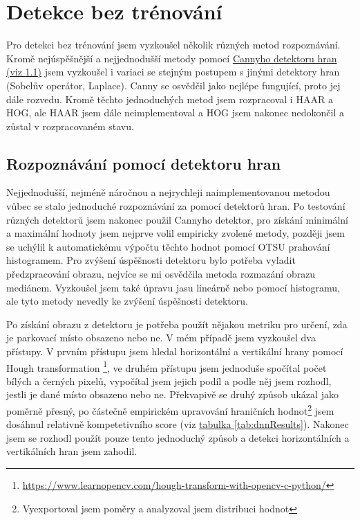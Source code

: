 \documentclass[10pt,a4paper, table]{article}
\begin{document}
\section{Detekce bez trénování}
Pro detekci bez trénování jsem vyzkoušel několik různých metod rozpoznávání. Kromě nejúspěšnější a nejjednodušší metody pomocí \hyperref[sec:canny]{Cannyho detektoru hran (viz \ref{sec:canny})} jsem vyzkoušel i variaci se stejným postupem s jinými detektory hran (Sobelův operátor, Laplace). Canny se osvědčil jako nejlépe fungující, proto jej dále rozvedu. Kromě těchto jednoduchých metod jsem rozpracoval i HAAR a HOG, ale HAAR jsem dále neimplementoval a HOG jsem nakonec nedokončil a zůstal v rozpracovaném stavu.

\subsection{Rozpoznávání pomocí detektoru hran} \label{sec:canny}
Nejjednodušší, nejméně náročnou a nejrychleji naimplementovanou metodou vůbec se stalo jednoduché rozpoznávání za pomocí detektorů hran. Po testování různých detektorů jsem nakonec použil Cannyho detektor, pro získání minimální a maximální hodnoty jsem nejprve volil empiricky zvolené metody, později jsem se uchýlil k automatickému výpočtu těchto hodnot pomocí OTSU prahování histogramem. Pro zvýšení úspěšnosti detektoru bylo potřeba vyladit předzpracování obrazu, nejvíce se mi osvědčila metoda rozmazání obrazu mediánem. Vyzkoušel jsem také úpravu jasu lineárně nebo pomocí histogramu, ale tyto metody nevedly ke zvýšení úspěšnosti detektoru.\par
Po získání obrazu z detektoru je potřeba použít nějakou metriku pro určení, zda je parkovací místo obsazeno nebo ne. V mém případě jsem vyzkoušel dva přístupy. V prvním přístupu jsem hledal horizontální a vertikální hrany pomocí Hough transformation \footnote{\url{https://www.learnopencv.com/hough-transform-with-opencv-c-python/}}, ve druhém přístupu jsem jednoduše spočítal počet bílých a černých pixelů, vypočítal jsem jejich podíl a podle něj jsem rozhodl, jestli je dané místo obsazeno nebo ne. Překvapivě se druhý způsob ukázal jako poměrně přesný, po částečně empirickém upravování hraničních hodnot\footnote{Vyexportoval jsem poměry a analyzoval jsem distribuci hodnot} jsem dosáhnul relativně kompetetivního score (viz \hyperref[tab:dnnResults]{tabulka \ref{tab:dnnResults}}). Nakonec jsem se rozhodl použít pouze tento jednoduchý způsob a detekci horizontálních a vertikálních hran jsem zahodil.
\end{document}
